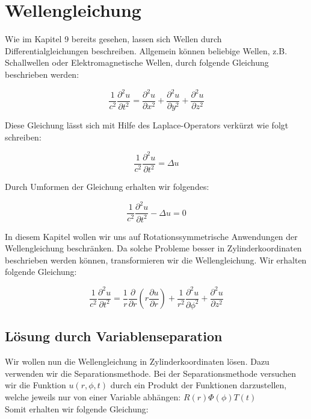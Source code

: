 \section{Wellengleichung}

Wie im Kapitel 9 bereits gesehen, lassen sich Wellen durch Differentialgleichungen beschreiben. Allgemein können beliebige Wellen, z.B. Schallwellen oder Elektromagnetische Wellen, durch folgende Gleichung beschrieben werden:

\begin{equation}
\frac{1}{c^2} \frac{\partial^2 u}{\partial t^2} = \frac{\partial^2 u}{\partial x^2} + \frac{\partial^2 u}{\partial y^2} + \frac{\partial^2 u}{\partial z^2}
\end{equation}

Diese Gleichung lässt sich mit Hilfe des Laplace-Operators verkürzt wie folgt schreiben:

\begin{equation}
\frac{1}{c^2} \frac{\partial^2 u}{\partial t^2} = \Delta u
\end{equation}

Durch Umformen der Gleichung erhalten wir folgendes:

\begin{equation}
\frac{1}{c^2} \frac{\partial^2 u}{\partial t^2} - \Delta u = 0
\end{equation}

In diesem Kapitel wollen wir uns auf Rotationssymmetrische Anwendungen der Wellengleichung beschränken. Da solche Probleme besser in Zylinderkoordinaten beschrieben werden können, transformieren wir die Wellengleichung. Wir erhalten folgende Gleichung:

\begin{equation}
\frac{1}{c^2} \frac{\partial^2 u}{\partial t^2} = \frac{1}{r} \frac{\partial}{\partial r}(r \frac{\partial u}{\partial r}) + \frac{1}{r^2} \frac{\partial^2 u}{\partial \phi^2} + \frac{\partial^2 u}{\partial z^2} 
\end{equation}

\subsection[Lösung durch Variablenseparation]{Lösung durch Variablenseparation}

Wir wollen nun die Wellengleichung in Zylinderkoordinaten lösen. Dazu verwenden wir die Separationsmethode.
Bei der Separationsmethode versuchen wir die Funktion $u(r, \phi, t)$ durch ein Produkt der Funktionen darzustellen, welche jeweils nur von einer Variable abhängen: $R(r)\Phi(\phi)T(t)$
\\Somit erhalten wir folgende Gleichung:

